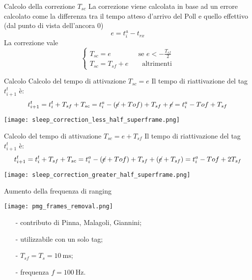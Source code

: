 \begin{frame}{Calcolo della correzione $T_{sc}$}
  La correzione viene calcolata in base ad un errore calcolato come la differenza tra il tempo atteso
  d'arrivo del Poll e quello effettivo (dal punto di vista dell'ancora 0)
  \[
  e = t_{i}^{a} - t_{rx}
  \]
  La correzione vale
  \[
  \begin{cases}
    T_{sc} = e \quad \quad \quad \quad \text{se } e < -\frac{T_{sf}}{2}\\
    T_{sc} = T_{sf} + e \quad \quad \text{altrimenti}
  \end{cases}
  \]
\end{frame}

\begin{frame}{Calcolo Calcolo del tempo di attivazione $T_{sc} = e$}
  Il tempo di riattivazione del tag $t_{i+1}^{t}$ è:
  \[
  t_{i+1}^{t} = t_{i}^{t} + T_{sf} + T_{sc} = t_i^a - (\cancel{e} + Tof) + T_{sf} + \cancel{e} = t_i^a - Tof + T_{sf} 
  \]
  \begin{center}
    \texttt{[image: sleep\_correction\_less\_half\_superframe.png]}
  \end{center}
\end{frame}

\begin{frame}{Calcolo del tempo di attivazione $T_{sc} = e + T_{sf}$}
  Il tempo di riattivazione del tag $t_{i+1}^{t}$ è:
  \[
  t_{i+1}^{t} = t_{i}^{t} + T_{sf} + T_{sc} = t_i^a - (\cancel{e} + Tof) + T_{sf} + (\cancel{e} + T_{sf}) = t_i^a - Tof + 2T_{sf} 
  \]
  \begin{center}
    \texttt{[image: sleep\_correction\_greater\_half\_superframe.png]}
  \end{center}
\end{frame}

\begin{frame}{Aumento della frequenza di ranging}
  \begin{center}
    \texttt{[image: pmg\_frames\_removal.png]}
  \end{center}
      
  \begin{itemize}
  \item[-] contributo di Pinna, Malagoli, Giannini;
  \item[-] utilizzabile con un solo tag;
  \item[-] $T_{sf} = T_s = \SI{10}{\milli\second}$;
  \item[-] frequenza $ f = \SI{100}{\hertz}$.
  \end{itemize}
\end{frame}

